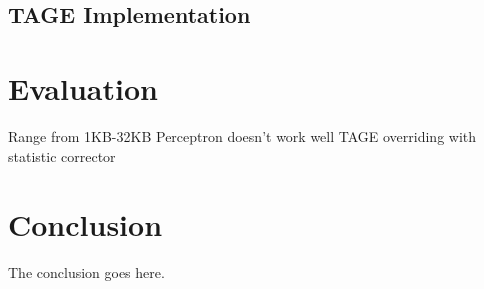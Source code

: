 \documentclass[conference]{IEEEtran}
\begin{document}
\subsection{TAGE Implementation}
\label{sec:fpga:tage}






\section{Evaluation}
\label{sec:eval}
Range from 1KB-32KB
Perceptron doesn't work well
TAGE overriding with statistic corrector


\section{Conclusion}
The conclusion goes here.












\end{document}
